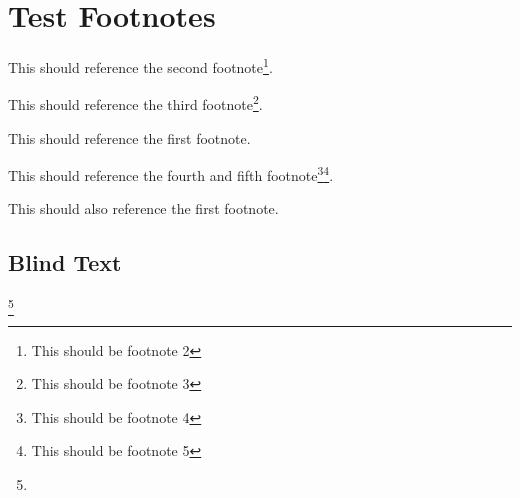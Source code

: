 
\section{Test Footnotes}


This should reference the second footnote\footnote{This should be footnote 2}.

This should reference the third footnote\footnote{This should be footnote 3}.

This should reference the first footnote.

This should reference the fourth and fifth footnote\footnote{This should be footnote 4}\footnote{This should be footnote 5}.

This should also reference the first footnote.

\subsection{Blind Text}

\blindtext[1]\footnote{\blindtext[1]}
